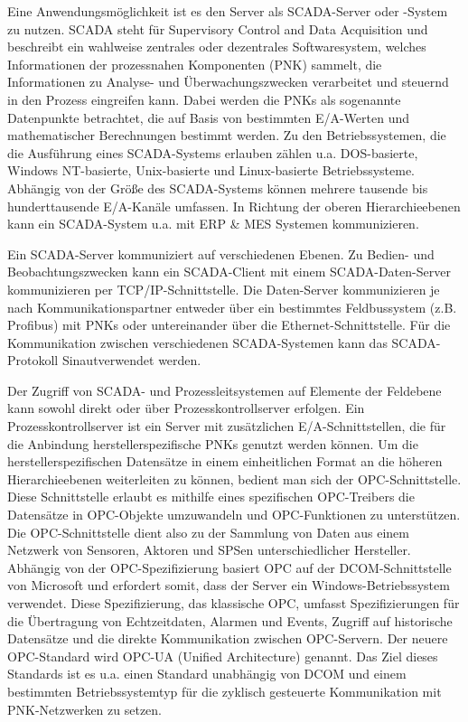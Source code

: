 Eine Anwendungsmöglichkeit ist es den Server als SCADA-Server oder -System zu nutzen. SCADA steht für Supervisory Control and Data Acquisition und beschreibt ein wahlweise zentrales oder dezentrales Softwaresystem, welches Informationen der prozessnahen Komponenten (PNK) sammelt, die Informationen zu Analyse- und Überwachungszwecken verarbeitet und steuernd in den Prozess eingreifen kann. Dabei werden die PNKs als sogenannte Datenpunkte betrachtet, die auf Basis von bestimmten E/A-Werten und mathematischer Berechnungen bestimmt werden. 
Zu den Betriebssystemen, die die Ausführung eines SCADA-Systems erlauben zählen u.a. DOS-basierte, Windows NT-basierte, Unix-basierte und Linux-basierte Betriebssysteme. Abhängig von der Größe des SCADA-Systems können mehrere tausende bis hunderttausende E/A-Kanäle umfassen\citep{SCADA2}. 
In Richtung der oberen Hierarchieebenen kann ein SCADA-System u.a. mit ERP \& MES Systemen kommunizieren\citep{SCADA3}.

Ein SCADA-Server kommuniziert auf verschiedenen Ebenen. Zu Bedien- und Beobachtungszwecken kann ein SCADA-Client mit einem SCADA-Daten-Server kommunizieren per TCP/IP-Schnittstelle. Die Daten-Server kommunizieren je nach Kommunikationspartner entweder über ein bestimmtes Feldbussystem (z.B. Profibus) mit PNKs oder untereinander über die Ethernet-Schnittstelle. Für die Kommunikation zwischen verschiedenen SCADA-Systemen kann das SCADA-Protokoll \glqq Sinaut\grqq  verwendet werden\citep{SCADA2}.


Der Zugriff von SCADA- und Prozessleitsystemen auf Elemente der Feldebene kann sowohl direkt oder über Prozesskontrollserver erfolgen. Ein Prozesskontrollserver ist ein Server mit zusätzlichen E/A-Schnittstellen, die für die Anbindung herstellerspezifische PNKs genutzt werden können. Um die herstellerspezifischen Datensätze in einem einheitlichen Format an die höheren Hierarchieebenen weiterleiten zu können, bedient man sich der OPC-Schnittstelle. Diese Schnittstelle erlaubt es mithilfe eines spezifischen OPC-Treibers die Datensätze in OPC-Objekte umzuwandeln und OPC-Funktionen zu unterstützen. Die OPC-Schnittstelle dient also zu der Sammlung von Daten aus einem Netzwerk von Sensoren, Aktoren und SPSen unterschiedlicher Hersteller. 
Abhängig von der OPC-Spezifizierung basiert OPC auf der DCOM-Schnittstelle von Microsoft und erfordert somit, dass der Server ein Windows-Betriebssystem verwendet. Diese Spezifizierung, das klassische OPC, umfasst Spezifizierungen für die Übertragung von Echtzeitdaten, Alarmen und Events, Zugriff auf historische Datensätze und die direkte Kommunikation zwischen OPC-Servern.
Der neuere OPC-Standard wird OPC-UA (Unified Architecture) genannt. Das Ziel dieses Standards ist es u.a. einen Standard unabhängig von DCOM und einem bestimmten Betriebssystemtyp für die zyklisch gesteuerte Kommunikation mit PNK-Netzwerken zu setzen.


